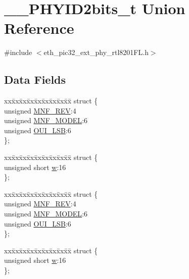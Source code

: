 \hypertarget{union_____p_h_y_i_d2bits__t}{}\section{\+\_\+\+\_\+\+P\+H\+Y\+I\+D2bits\+\_\+t Union Reference}
\label{union_____p_h_y_i_d2bits__t}


{\ttfamily \#include $<$eth\+\_\+pic32\+\_\+ext\+\_\+phy\+\_\+rtl8201\+F\+L.\+h$>$}

\subsection*{Data Fields}
\begin{DoxyCompactItemize}
\item 
\begin{tabbing}
xx\=xx\=xx\=xx\=xx\=xx\=xx\=xx\=xx\=\kill
struct \{\\
\>unsigned \hyperlink{union_____p_h_y_i_d2bits__t_ae0be20960cb0928819df0b687da7136e}{MNF\_REV}:4\\
\>unsigned \hyperlink{union_____p_h_y_i_d2bits__t_afdf9c4b774c086b088160fb5c6b27ece}{MNF\_MODEL}:6\\
\>unsigned \hyperlink{union_____p_h_y_i_d2bits__t_a23fabf91be9157cf6b20f6c089dba136}{OUI\_LSB}:6\\
\}; \\

\end{tabbing}\item 
\begin{tabbing}
xx\=xx\=xx\=xx\=xx\=xx\=xx\=xx\=xx\=\kill
struct \{\\
\>unsigned short \hyperlink{union_____p_h_y_i_d2bits__t_a160850a4684a3e82c2323033964f2e98}{w}:16\\
\}; \\

\end{tabbing}\item 
\begin{tabbing}
xx\=xx\=xx\=xx\=xx\=xx\=xx\=xx\=xx\=\kill
struct \{\\
\>unsigned \hyperlink{union_____p_h_y_i_d2bits__t_ae0be20960cb0928819df0b687da7136e}{MNF\_REV}:4\\
\>unsigned \hyperlink{union_____p_h_y_i_d2bits__t_afdf9c4b774c086b088160fb5c6b27ece}{MNF\_MODEL}:6\\
\>unsigned \hyperlink{union_____p_h_y_i_d2bits__t_a23fabf91be9157cf6b20f6c089dba136}{OUI\_LSB}:6\\
\}; \\

\end{tabbing}\item 
\begin{tabbing}
xx\=xx\=xx\=xx\=xx\=xx\=xx\=xx\=xx\=\kill
struct \{\\
\>unsigned short \hyperlink{union_____p_h_y_i_d2bits__t_a160850a4684a3e82c2323033964f2e98}{w}:16\\
\}; \\

\end{tabbing}\end{DoxyCompactItemize}


